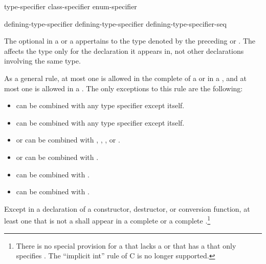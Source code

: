 \begin{bnf}
\br
    type-specifier\br
    class-specifier\br
    enum-specifier
\end{bnf}

\begin{bnf}
\br
  defining-type-specifier \br
  defining-type-specifier defining-type-specifier-seq
\end{bnf}

The optional  in a 
or a 
appertains
to the type denoted by the preceding 
or . The
 affects the type only for the declaration it appears in,
not other declarations involving the same type.

\pnum
As a general rule, at most one
is allowed in the complete
 of a  or in a
,
and at most one
is allowed in a
.
The only exceptions to this rule are the following:
\begin{itemize}
\item {} can be combined with any type specifier except itself.

\item {} can be combined with any type specifier except itself.

\item {} or  can be combined with
, , , or .

\item {} or  can be combined with .

\item {} can be combined with .

\item {} can be combined with .
\end{itemize}

\pnum
Except in a declaration of a constructor, destructor, or conversion
function, at least one  that is not a
 shall appear in a complete
 or a complete
.\footnote{There is no special
provision for a  that
lacks a  or that has a
 that only specifies .
The ``implicit int'' rule of C is no longer supported.}

